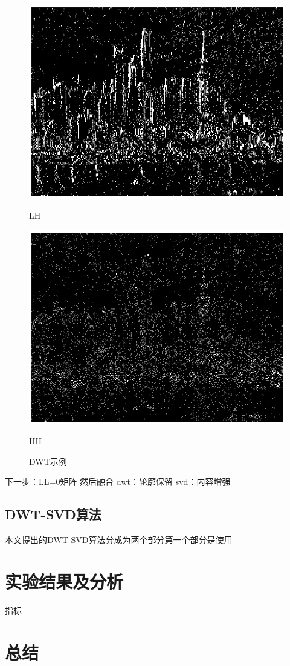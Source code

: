 \documentclass[12pt]{book}
\begin{document}
\begin{figure}[ht]
					\begin{minipage}{0.48\linewidth}
						\centerline{\includegraphics[width=1\textwidth]{./figures/LH.eps}}
						\centerline{LH}
					\end{minipage}
					\qquad
					\begin{minipage}{0.48\linewidth}
						\centerline{\includegraphics[width=1\textwidth]{./figures/HH.eps}}
						\centerline{HH}
					\end{minipage}
					\caption{DWT示例\label{DWT}}
				\end{figure}

下一步：LL=0矩阵 然后融合
dwt：轮廓保留  
svd：内容增强

		\section{DWT-SVD算法}本文提出的DWT-SVD算法分成为两个部分第一个部分是使用
	\chapter{实验结果及分析}指标

	\chapter{总结}
\end{document}
